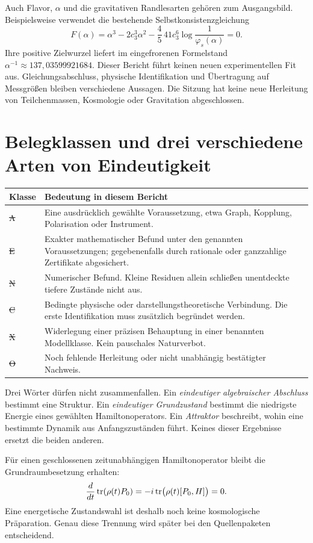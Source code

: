 Auch Flavor, $\alpha$ und die gravitativen Randlesarten gehören zum Ausgangsbild. Beispielsweise verwendet die bestehende Selbstkonsistenzgleichung
\[
 F(\alpha)=\alpha^3-2c_3^3\alpha^2-\frac45\,41c_3^6
 \log\!\frac1{\varphi_s(\alpha)}=0.
\]
Ihre positive Zielwurzel liefert im eingefrorenen Formelstand $\alpha^{-1}\approx137{,}03599921684$. Dieser Bericht führt keinen neuen experimentellen Fit aus. Gleichungsabschluss, physische Identifikation und Übertragung auf Messgrößen bleiben verschiedene Aussagen. Die Sitzung hat keine neue Herleitung von Teilchenmassen, Kosmologie oder Gravitation abgeschlossen. 

\section{Belegklassen und drei verschiedene Arten von Eindeutigkeit}
\noindent\begin{tabularx}{\textwidth}{@{}lY@{}}
\toprule
Klasse & Bedeutung in diesem Bericht\\\midrule
\st{A} & Eine ausdrücklich gewählte Voraussetzung, etwa Graph, Kopplung, Polarisation oder Instrument.\\
\st{E} & Exakter mathematischer Befund unter den genannten Voraussetzungen; gegebenenfalls durch rationale oder ganzzahlige Zertifikate abgesichert.\\
\st{N} & Numerischer Befund. Kleine Residuen allein schließen unentdeckte tiefere Zustände nicht aus.\\
\st{C} & Bedingte physische oder darstellungstheoretische Verbindung. Die erste Identifikation muss zusätzlich begründet werden.\\
\st{X} & Widerlegung einer präzisen Behauptung in einer benannten Modellklasse. Kein pauschales Naturverbot.\\
\st{O} & Noch fehlende Herleitung oder nicht unabhängig bestätigter Nachweis.\\\bottomrule
\end{tabularx}

Drei Wörter dürfen nicht zusammenfallen. Ein \emph{eindeutiger algebraischer Abschluss} bestimmt eine Struktur. Ein \emph{eindeutiger Grundzustand} bestimmt die niedrigste Energie eines gewählten Hamiltonoperators. Ein \emph{Attraktor} beschreibt, wohin eine bestimmte Dynamik aus Anfangszuständen führt. Keines dieser Ergebnisse ersetzt die beiden anderen.

Für einen geschlossenen zeitunabhängigen Hamiltonoperator bleibt die Grundraumbesetzung erhalten:
\[
 \frac{d}{dt}\operatorname{tr}(\rho(t)P_0)
 =-i\operatorname{tr}\bigl(\rho(t)[P_0,H]\bigr)=0.
\]
Eine energetische Zustandswahl ist deshalb noch keine kosmologische Präparation. Genau diese Trennung wird später bei den Quellenpaketen entscheidend.

